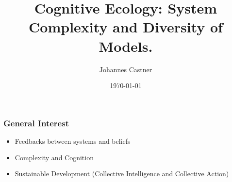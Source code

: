 \documentclass{beamer}
\date{\today}
\begin{document}
\title{Cognitive Ecology: System Complexity and Diversity of Models.}



\author{Johannes Castner}
\begin{frame}
\titlepage


\end{frame}


\begin{frame}
\frametitle{General Interest}
\begin{itemize}
\item Feedbacks between systems and beliefs 
\hfill \break
\item Complexity and Cognition
\hfill \break
\item Sustainable Development (Collective Intelligence and Collective Action) 
\end{itemize}
\end{frame}
\end{document}
